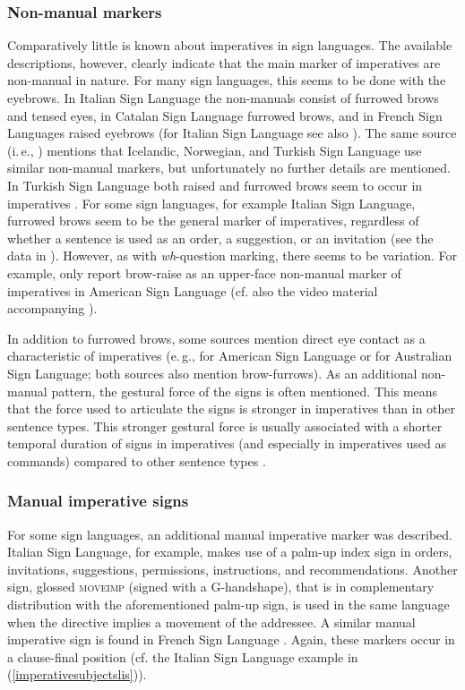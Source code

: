 \subsubsection{Non-manual markers}
Comparatively little is known about imperatives in sign languages. The available descriptions, however, clearly indicate that the main marker of imperatives are non-manual in nature. For many sign languages, this seems to be done with the eyebrows. In Italian Sign Language the non-manuals consist of furrowed brows and tensed eyes, in Catalan Sign Language furrowed brows, and in French Sign Languages raised eyebrows \citep{donati2017searching} (for Italian Sign Language see also \citealt{brunelli2011antisymmetry}). The same source (i.\,e., \citealt{donati2017searching}) mentions that Icelandic, Norwegian, and Turkish Sign Language use similar non-manual markers, but unfortunately no further details are mentioned. In Turkish Sign Language both raised and furrowed brows seem to occur in imperatives \citep{ozsoy2014commands}. For some sign languages, for example Italian Sign Language, furrowed brows seem to be the general marker of imperatives, regardless of whether a sentence is used as an order, a suggestion, or an invitation (see the data in \citealt[306--307]{signgram2017}). However, as with \textit{wh}-question marking, there seems to be variation. For example, \citet{brentari2018production} only report brow-raise as an upper-face non-manual marker of imperatives in American Sign Language (cf. also the video material accompanying \citealt{brentari2018production}).

In addition to furrowed brows, some sources mention direct eye contact as a characteristic of imperatives (e.\,g., \citealt[143]{valli2000linguistics} for American Sign Language or \citealt[201]{johnston2007australian} for Australian Sign Language; both sources also mention brow-furrows). As an additional non-manual pattern, the gestural force of the signs is often mentioned. This means that the force used to articulate the signs is stronger in imperatives than in other sentence types. This stronger gestural force is usually associated with a shorter temporal duration of signs in imperatives (and especially in imperatives used as commands) compared to other sentence types \citep{brentari2018production}.

\subsubsection{Manual imperative signs}
For some sign languages, an additional manual imperative marker was described. Italian Sign Language, for example, makes use of a palm-up index sign in orders, invitations, suggestions, permissions, instructions, and recommendations. Another sign, glossed \textsc{moveimp} (signed with a G-handshape), that is in complementary distribution with the aforementioned palm-up sign, is used in the same language when the directive implies a movement of the addressee. A similar manual imperative sign is found in French Sign Language  \citep{donati2017searching}. Again, these markers occur in a clause-final position (cf. the Italian Sign Language example in (\ref{imperativesubjectslis})).

